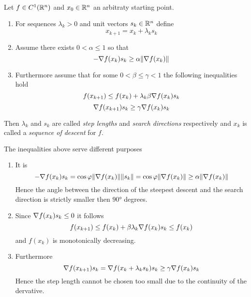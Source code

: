 \begin{definition}
    Let \( f \in C^1(\mathbb{R}^n) \) and \( x_0 \in \mathbb{R}^n \) an arbitraty starting point.
    \begin{enumerate}
        \item For sequences \( \lambda_k > 0 \) and unit vectors \( s_k \in \mathbb{R}^n \) define
              \[
                  x_{k + 1} = x_k + \lambda_k s_k
              \]
        \item Assume there exists \( 0 < \alpha \le 1 \) so that
              \[
                  - \nabla f(x_k) s_k \ge \alpha \|\nabla f(x_k)\|
              \]
        \item Furthermore assume that for some \( 0 < \beta \le \gamma < 1 \) the following inequalities hold
              \[
                  f(x_{k + 1}) \le f(x_k) + \lambda_k \beta \nabla f(x_k) s_k
              \]
              \[
                  \nabla f(x_{k + 1}) s_k \ge \gamma \nabla f(x_k) s_k
              \]
    \end{enumerate}
    Then \( \lambda_k \) and  \( s_k \) are called \emph{step lengths} and \emph{search directions} respectively
    and \( x_k \) is called a \emph{sequence of descent} for \( f \).
\end{definition}
\bigskip


\begin{remarks}
    The inequalities above serve different purposes
    \begin{enumerate}
        \item  It is
              \[
                  - \nabla f(x_k) s_k = \cos\varphi \|\nabla f(x_k)\| \|s_k\| =
                  \cos\varphi \|\nabla f(x_k)\| \ge \alpha \|\nabla f(x_k)\|
              \]
              Hence the angle between the direction of the steepest descent and the search direction is
              strictly smaller then \( \ang{90} \) degrees.
        \item  Since \( \nabla f(x_k) s_k \le 0 \) it follows
              \[
                  f(x_{k + 1}) \le f(x_k) + \beta \lambda_k \nabla f(x_k) s_k \le f(x_k)
              \]
              and \( f(x_k) \) is monotonically decreasing.
        \item Furthermore
              \[
                  \nabla f(x_{k + 1}) s_k = \nabla f(x_k + \lambda_k s_k) s_k
                  \ge \gamma \nabla f(x_k) s_k
              \]
              Hence the step length cannot be chosen too small due to the continuity of the dervative.
    \end{enumerate}
\end{remarks}
\bigskip



